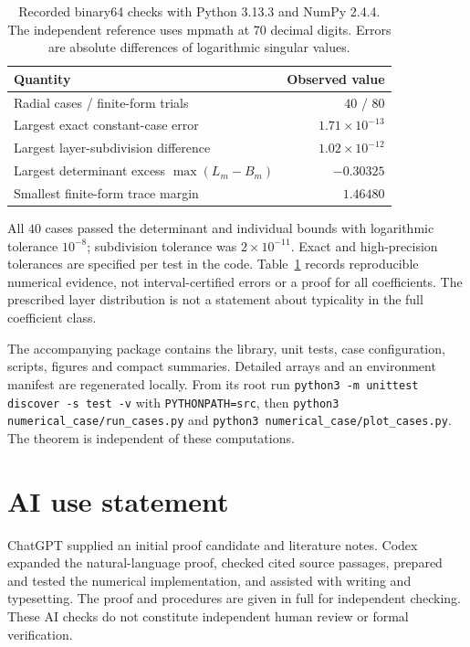 \documentclass[11pt]{article}
\theoremstyle{remark}
\begin{document}
\begin{table}[htbp]
 \centering
 \caption{Recorded binary64 checks with Python 3.13.3 and NumPy 2.4.4.
 The independent reference uses mpmath at 70 decimal digits. Errors are
 absolute differences of logarithmic singular values.}\label{tab:checks}
 \begin{tabular}{lr}\toprule
 Quantity & Observed value\\\midrule
 Radial cases / finite-form trials & $40$ / $80$\\
 Largest exact constant-case error & $1.71\times10^{-13}$\\
 Largest layer-subdivision difference & $1.02\times10^{-12}$\\
 Largest determinant excess $\max(L_m-B_m)$ & $-0.30325$\\
 Smallest finite-form trace margin & $1.46480$\\\bottomrule
 \end{tabular}
\end{table}

All $40$ cases passed the determinant and individual bounds with
logarithmic tolerance $10^{-8}$; subdivision tolerance was
$2\times10^{-11}$. Exact and high-precision tolerances are specified
per test in the code. Table~\ref{tab:checks} records reproducible
numerical evidence, not interval-certified errors or a proof for all
coefficients. The prescribed layer distribution is not a statement about
typicality in the full coefficient class.

The accompanying package contains the library, unit tests, case configuration,
scripts, figures and compact summaries. Detailed arrays and an environment
manifest are regenerated locally. From its root run
\texttt{python3 -m unittest discover -s test -v} with
\texttt{PYTHONPATH=src}, then
\texttt{python3 numerical\_case/run\_cases.py} and
\texttt{python3 numerical\_case/plot\_cases.py}.
The theorem is independent of these computations.



\section*{AI use statement}
ChatGPT supplied an initial proof candidate and literature notes.
Codex expanded the natural-language proof, checked cited source passages,
prepared and tested the numerical implementation, and assisted with writing
and typesetting. The proof and procedures are given in full for independent
checking. These AI checks do not constitute independent human review or
formal verification.
\end{document}
